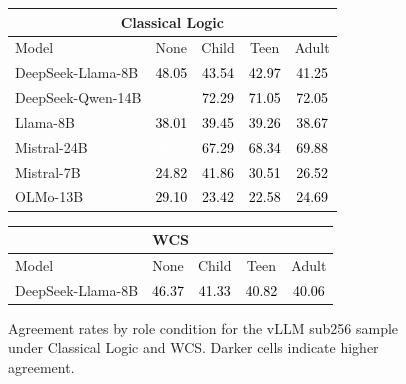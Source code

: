 \begin{figure}[H]
\centering
\caption{Agreement rates by role condition for the vLLM sub256 sample under Classical Logic and WCS. Darker cells indicate higher agreement.}
\label{fig:role-heatmap-vllm}
\small
\begin{tabular}{lcccc}
\multicolumn{5}{c}{\textbf{Classical Logic}} \\
\toprule
Model & None & Child & Teen & Adult \\
\midrule
DeepSeek-Llama-8B & \cellcolor[HTML]{A1BEA9}\textcolor{black}{48.05} & \cellcolor[HTML]{A9C4B0}\textcolor{black}{43.54} & \cellcolor[HTML]{ABC5B2}\textcolor{black}{42.97} & \cellcolor[HTML]{AFC8B5}\textcolor{black}{41.25} \\

DeepSeek-Qwen-14B & \cellcolor[HTML]{699774}\textcolor{white}{76.60} & \cellcolor[HTML]{739E7D}\textcolor{black}{72.29} & \cellcolor[HTML]{759F7F}\textcolor{black}{71.05} & \cellcolor[HTML]{739E7D}\textcolor{black}{72.05} \\

Llama-8B & \cellcolor[HTML]{B5CCBB}\textcolor{black}{38.01} & \cellcolor[HTML]{B3CAB9}\textcolor{black}{39.45} & \cellcolor[HTML]{B3CAB9}\textcolor{black}{39.26} & \cellcolor[HTML]{B3CAB9}\textcolor{black}{38.67} \\

Mistral-24B & \cellcolor[HTML]{6B9876}\textcolor{white}{76.21} & \cellcolor[HTML]{7CA586}\textcolor{black}{67.29} & \cellcolor[HTML]{7AA385}\textcolor{black}{68.34} & \cellcolor[HTML]{76A081}\textcolor{black}{69.88} \\

Mistral-7B & \cellcolor[HTML]{CEDDD2}\textcolor{black}{24.82} & \cellcolor[HTML]{ADC6B3}\textcolor{black}{41.86} & \cellcolor[HTML]{C3D5C7}\textcolor{black}{30.51} & \cellcolor[HTML]{CADBCE}\textcolor{black}{26.52} \\

OLMo-13B & \cellcolor[HTML]{C6D8CB}\textcolor{black}{29.10} & \cellcolor[HTML]{D2E0D6}\textcolor{black}{23.42} & \cellcolor[HTML]{D2E0D6}\textcolor{black}{22.58} & \cellcolor[HTML]{CEDDD2}\textcolor{black}{24.69} \\

\bottomrule
\end{tabular}
\vspace{1.0em}
\begin{tabular}{lcccc}
\multicolumn{5}{c}{\textbf{WCS}} \\
\toprule
Model & None & Child & Teen & Adult \\
\midrule
DeepSeek-Llama-8B & \cellcolor[HTML]{A5B2CF}\textcolor{black}{46.37} & \cellcolor[HTML]{AFBBD4}\textcolor{black}{41.33} & \cellcolor[HTML]{AFBBD4}\textcolor{black}{40.82} & \cellcolor[HTML]{B1BCD5}\textcolor{black}{40.06} \\


\end{tabular}
\end{figure}
